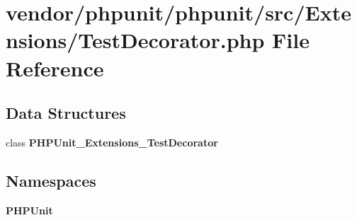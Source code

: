 \section{vendor/phpunit/phpunit/src/\+Extensions/\+Test\+Decorator.php File Reference}
\label{_test_decorator_8php}
\subsection*{Data Structures}
\begin{DoxyCompactItemize}
\item 
class {\bf P\+H\+P\+Unit\+\_\+\+Extensions\+\_\+\+Test\+Decorator}
\end{DoxyCompactItemize}
\subsection*{Namespaces}
\begin{DoxyCompactItemize}
\item 
 {\bf P\+H\+P\+Unit}
\end{DoxyCompactItemize}
